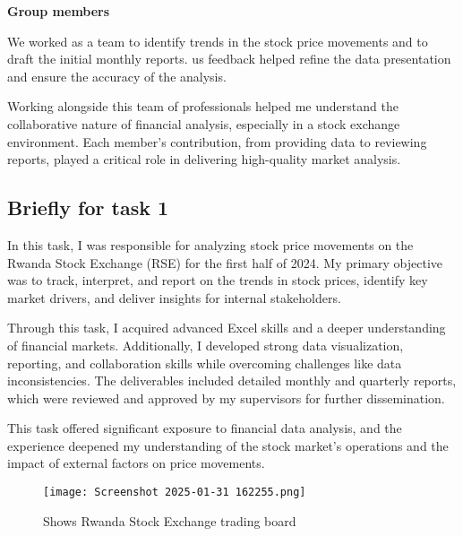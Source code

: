\documentclass{article}
\begin{document}
\begin{titlepage}
\begin{titlepage}
\begin{flushleft}
\begin{flushleft}
\textbf{Group members}
\vspace{0.2cm}

We worked as a team to identify trends in the stock price movements and to draft the initial monthly reports. us feedback helped refine the data presentation and ensure the accuracy of the analysis.
\vspace{0.8cm}

Working alongside this team of professionals helped me understand the collaborative nature of financial analysis, especially in a stock exchange environment. Each member's contribution, from providing data to reviewing reports, played a critical role in delivering high-quality market analysis.
\vspace{0.3cm}

\subsection{\textbf{\Large{Briefly for task 1}}}
\vspace{0.2cm}
In this task, I was responsible for analyzing stock price movements on the Rwanda Stock Exchange (RSE) for the first half of 2024. My primary objective was to track, interpret, and report on the trends in stock prices, identify key market drivers, and deliver insights for internal stakeholders.
\vspace{0.15cm}

Through this task, I acquired advanced Excel skills and a deeper understanding of financial markets. Additionally, I developed strong data visualization, reporting, and collaboration skills while overcoming challenges like data inconsistencies. The deliverables included detailed monthly and quarterly reports, which were reviewed and approved by my supervisors for further dissemination.
\vspace{0.15cm}

This task offered significant exposure to financial data analysis, and the experience deepened my understanding of the stock market's operations and the impact of external factors on price movements.
\vspace{0.15cm}

\begin{figure}
    \centering
    \texttt{[image: Screenshot 2025-01-31 162255.png]}
    \caption{Shows Rwanda Stock Exchange trading board}
    \label{fig:enter-label}
\end{figure}

\vspace{0.7cm}
\newpage


\end{flushleft}
\end{flushleft}
\end{titlepage}
\end{titlepage}
\end{document}
